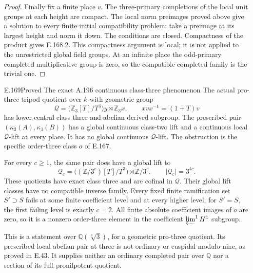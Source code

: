 \begin{proof}
Finally fix a finite place \(v\).  The three-primary completions of
the local unit groups at each height are compact.  The local
norm preimages proved above give a solution to every finite
initial compatibility problem: take a preimage at its largest
height and norm it down.  The conditions are closed.  Compactness
of the product gives E.168.2.  This compactness argument is local;
it is not applied to the unrestricted global field groups.  At an
infinite place the odd-primary completed multiplicative group is
zero, so the compatible completed family is the trivial one.
\end{proof}

\begin{result}{E.169}{Proved}
{The exact A.196 continuous class-three phenomenon}
The actual pro-three tripod quotient over \(k\) with geometric
group
\[
 \mathcal Q=\bigl(\mathbb Z_3[T]/T^3\bigr)y\rtimes\mathbb Z_3x,
                   \qquad xvx^{-1}=(1+T)v
\tag{E.169.1}
\]
has lower-central class three and abelian derived subgroup.
The prescribed pair \((\kappa_3(A),\kappa_3(B))\) has a global
continuous class-two lift and a continuous local
\(\mathcal Q\)-lift at every place.  It has no global
continuous \(\mathcal Q\)-lift.  The obstruction is the
specific order-three class \(o\) of E.167.

For every \(c\ge1\), the same pair does have a global lift to
\[
 \mathcal Q_c=\bigl((\mathbb Z/3^c)[T]/T^3\bigr)\rtimes\mathbb Z/3^c,
               \qquad |\mathcal Q_c|=3^{4c}.
\tag{E.169.2}
\]
These quotients have exact class three and are cofinal in
\(\mathcal Q\).  Their global lift classes have no compatible
inverse family.  Every fixed finite ramification set \(S'\supset S\)
fails at some finite coefficient level and at every higher level;
for \(S'=S\), the first failing level is exactly \(c=2\).
All finite absolute coefficient images of \(o\) are zero, so
it is a nonzero order-three element in the coefficient
\(\varprojlim^1 H^1\) subgroup.

This is a statement over \(\mathbb Q(\sqrt[3]{3})\), for a geometric
pro-three quotient.  Its prescribed local abelian pair at three
is not ordinary or cuspidal modulo nine, as proved in E.43.
It supplies neither an ordinary completed pair over \(\mathbb Q\)
nor a section of its full pronilpotent quotient.
\end{result}

